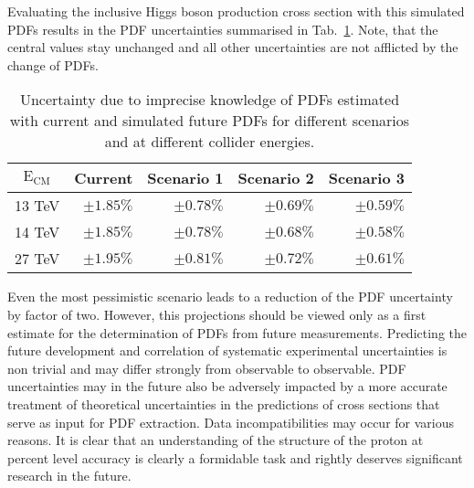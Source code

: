 Evaluating the inclusive Higgs boson production cross section with this simulated PDFs results in the PDF uncertainties summarised in Tab.~\ref{tab:PDFuncert}.
Note, that the central values stay unchanged and all other uncertainties are not afflicted by the change of PDFs.
\begin{table}[!h]
\normalsize\setlength{\tabcolsep}{2pt}
\begin{center}
    \begin{tabular}{rrrrr}
        \toprule
        \multicolumn{1}{c}{$\textrm{E}_{\textrm{CM}}$}&
        \multicolumn{1}{c}{Current  }&
        \multicolumn{1}{c}{Scenario 1 }&
        \multicolumn{1}{c}{Scenario 2}&
        \multicolumn{1}{c}{Scenario 3} \\
        \midrule
13 TeV & $ \pm 1.85 \% $ & $\pm 0.78 \%$ & $\pm 0.69\%$ & $\pm 0.59\%$ \\\midrule
14 TeV & $ \pm 1.85 \% $ & $\pm 0.78\%$ & $\pm 0.68\%$ & $\pm 0.58\%$ \\\midrule
27 TeV & $ \pm 1.95 \%$  & $\pm 0.81\%$ & $\pm 0.72\%$ & $\pm 0.61\%$ \\\midrule
    \end{tabular}
    \caption{Uncertainty due to imprecise knowledge of PDFs estimated with current and simulated future PDFs for different scenarios and at different collider energies.\label{tab:PDFuncert}}
\end{center}
\end{table}
Even the most pessimistic scenario leads to a reduction of the PDF uncertainty by factor of two. 
However, this projections should be viewed only as a first estimate for the determination of PDFs from future measurements.
Predicting the future development and correlation of systematic experimental uncertainties is non trivial and may differ strongly from observable to observable. 
PDF uncertainties may in the future also be adversely impacted by a more accurate treatment of theoretical uncertainties in the predictions of cross sections that serve as input for PDF extraction.
Data incompatibilities may occur for various reasons.
It is clear that an understanding of the structure of the proton at percent level accuracy is clearly a formidable task and rightly deserves significant research in the future.




